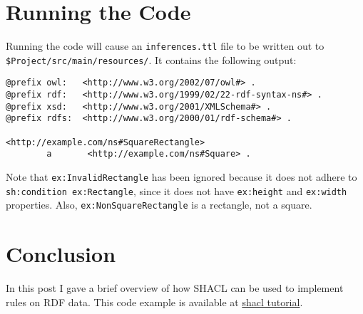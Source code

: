 \documentclass{amsart}
\begin{document}
  
  \section{Running the Code}
  Running the code will cause an \texttt{inferences.ttl} file to be written out to \\\texttt{\$Project/src/main/resources/}. It contains the following output:
  \begin{small}
  \begin{Verbatim} 
@prefix owl:   <http://www.w3.org/2002/07/owl#> .
@prefix rdf:   <http://www.w3.org/1999/02/22-rdf-syntax-ns#> .
@prefix xsd:   <http://www.w3.org/2001/XMLSchema#> .
@prefix rdfs:  <http://www.w3.org/2000/01/rdf-schema#> .

<http://example.com/ns#SquareRectangle>
        a       <http://example.com/ns#Square> .
  \end{Verbatim}
  \end{small}
  Note that \texttt{ex:InvalidRectangle} has been ignored because it does not adhere to \texttt{sh:condition ex:Rectangle}, since it does not have \texttt{ex:height} and \texttt{ex:width} properties. Also, \texttt{ex:NonSquareRectangle} is a rectangle, not a square.

  \section{Conclusion}
  In this post I gave a brief overview of how SHACL can be used to implement rules on RDF data. This code example is available at 
  \href{https://github.com/henrietteharmse/henrietteharmse/tree/master/blog/tutorial/jena/source/shacl}{shacl tutorial}.
  
  
  
  
  
  
  
 
\end{document}

